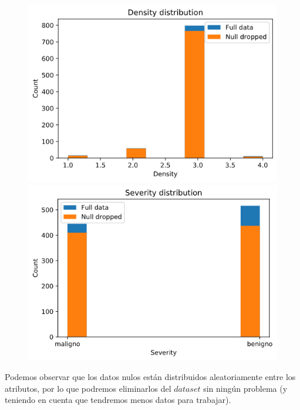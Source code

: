 \documentclass[11pt,a4paper]{article}
\begin{document}
\begin{figure}[H]
\centering

\begin{minipage}{0.5\textwidth}
    \centering
    \includegraphics[scale=0.35]{img/density-distribution.png}
\end{minipage}%
\begin{minipage}{0.5\textwidth}
    \centering
    \includegraphics[scale=0.35]{img/severity-distribution.png}
\end{minipage}

\end{figure}

Podemos observar que los datos nulos están distribuidos aleatoriamente entre los atributos, por lo que podremos eliminarlos
del $dataset$ sin ningún problema (y teniendo en cuenta que tendremos menos datos para trabajar).
\end{document}
